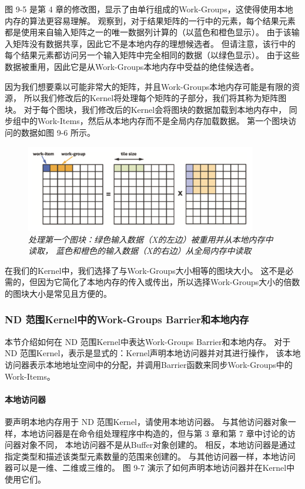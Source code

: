 图 9-5 是第 4 章的修改图，显示了由单行组成的Work-Groups，这使得使用本地内存的算法更容易理解。 
观察到，对于结果矩阵的一行中的元素，每个结果元素都是使用来自输入矩阵之一的唯一数据列计算的（以蓝色和橙色显示）。 
由于该输入矩阵没有数据共享，因此它不是本地内存的理想候选者。 
但请注意，该行中的每个结果元素都访问另一个输入矩阵中完全相同的数据（以绿色显示）。 
由于这些数据被重用，因此它是从Work-Groups本地内存中受益的绝佳候选者。

因为我们想要乘以可能非常大的矩阵，并且Work-Groups本地内存可能是有限的资源，
所以我们修改后的Kernel将处理每个矩阵的子部分，我们将其称为矩阵图块。 
对于每个图块，我们修改后的Kernel会将图块的数据加载到本地内存中，
同步组中的Work-Items，然后从本地内存而不是全局内存加载数据。 
第一个图块访问的数据如图 9-6 所示。

\begin{figure}[H]
	\centering
	\includegraphics[width=0.9\textwidth]{figs/F9.6.png}
	\caption{\textit{处理第一个图块：绿色输入数据（X的左边）被重用并从本地内存中读取，
蓝色和橙色的输入数据（X的右边）从全局内存中读取 }}
\end{figure}

在我们的Kernel中，我们选择了与Work-Groups大小相等的图块大小。 
这不是必需的，但因为它简化了本地内存的传入或传出，所以选择Work-Groups大小的倍数的图块大小是常见且方便的。

\subsubsection{ND 范围Kernel中的Work-Groups Barrier和本地内存}
本节介绍如何在 ND 范围Kernel中表达Work-Groups Barrier和本地内存。 
对于 ND 范围Kernel，表示是显式的：Kernel声明本地访问器并对其进行操作，
该本地访问器表示本地地址空间中的分配，并调用Barrier函数来同步Work-Groups中的Work-Items。

\paragraph{本地访问器}

要声明本地内存用于 ND 范围Kernel，请使用本地访问器。 
与其他访问器对象一样，本地访问器是在命令组处理程序中构造的，但与第 3 章和第 7 章中讨论的访问器对象不同，
本地访问器不是从Buffer对象创建的。 相反，本地访问器是通过指定类型和描述该类型元素数量的范围来创建的。 
与其他访问器一样，本地访问器可以是一维、二维或三维的。 图 9-7 演示了如何声明本地访问器并在Kernel中使用它们。

